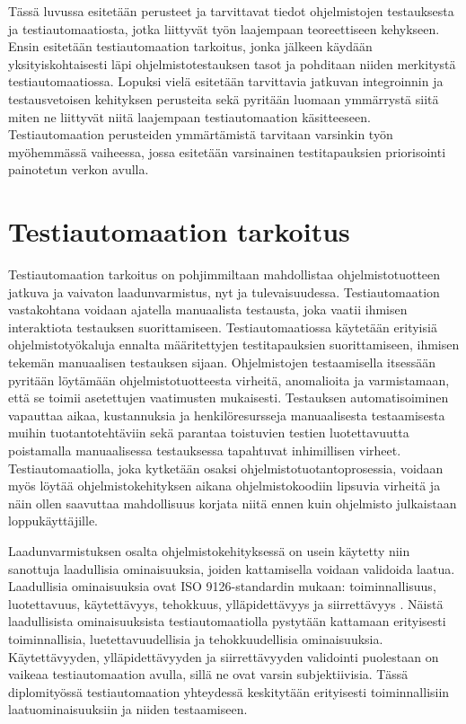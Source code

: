Tässä luvussa esitetään perusteet ja tarvittavat tiedot ohjelmistojen testauksesta ja testiautomaatiosta, jotka liittyvät työn laajempaan teoreettiseen kehykseen.
Ensin esitetään testiautomaation tarkoitus, jonka jälkeen käydään yksityiskohtaisesti läpi ohjelmistotestauksen tasot ja pohditaan niiden merkitystä testiautomaatiossa.
Lopuksi vielä esitetään tarvittavia jatkuvan integroinnin ja testausvetoisen kehityksen perusteita sekä pyritään luomaan ymmärrystä siitä miten ne liittyvät niitä laajempaan testiautomaation käsitteeseen.
Testiautomaation perusteiden ymmärtämistä tarvitaan varsinkin työn myöhemmässä vaiheessa, jossa esitetään varsinainen testitapauksien priorisointi painotetun verkon avulla.

\section{Testiautomaation tarkoitus} \label{ch:07_testiautomaation_tarkoitus}

  Testiautomaation tarkoitus on pohjimmiltaan mahdollistaa ohjelmistotuotteen jatkuva ja vaivaton laadunvarmistus, nyt ja tulevaisuudessa.
  Testiautomaation vastakohtana voidaan ajatella manuaalista testausta, joka vaatii ihmisen interaktiota testauksen suorittamiseen.
  Testiautomaatiossa käytetään erityisiä ohjelmistotyökaluja ennalta määritettyjen testitapauksien suorittamiseen, ihmisen tekemän manuaalisen testauksen sijaan.
  Ohjelmistojen testaamisella itsessään pyritään löytämään ohjelmistotuotteesta virheitä, anomalioita ja varmistamaan, että se toimii asetettujen vaatimusten mukaisesti.
  Testauksen automatisoiminen vapauttaa aikaa, kustannuksia ja henkilöresursseja manuaalisesta testaamisesta muihin tuotantotehtäviin sekä parantaa toistuvien testien luotettavuutta poistamalla manuaalisessa testauksessa tapahtuvat inhimillisen virheet.
  Testiautomaatiolla, joka kytketään osaksi ohjelmistotuotantoprosessia, voidaan myös löytää ohjelmistokehityksen aikana ohjelmistokoodiin lipsuvia virheitä ja näin ollen saavuttaa mahdollisuus korjata niitä ennen kuin ohjelmisto julkaistaan loppukäyttäjille.

  Laadunvarmistuksen osalta ohjelmistokehityksessä on usein käytetty niin sanottuja laadullisia ominaisuuksia, joiden kattamisella voidaan validoida laatua.
  Laadullisia ominaisuuksia ovat ISO 9126-standardin mukaan: toiminnallisuus, luotettavuus, käytettävyys, tehokkuus, ylläpidettävyys ja siirrettävyys \parencite{iso_9126-1_2001}.
  Näistä laadullisista ominaisuuksista testiautomaatiolla pystytään kattamaan erityisesti toiminnallisia, luetettavuudellisia ja tehokkuudellisia ominaisuuksia.
  Käytettävyyden, ylläpidettävyyden ja siirrettävyyden validointi puolestaan on vaikeaa testiautomaation avulla, sillä ne ovat varsin subjektiivisia.
  Tässä diplomityössä testiautomaation yhteydessä keskitytään erityisesti toiminnallisiin laatuominaisuuksiin ja niiden testaamiseen.


